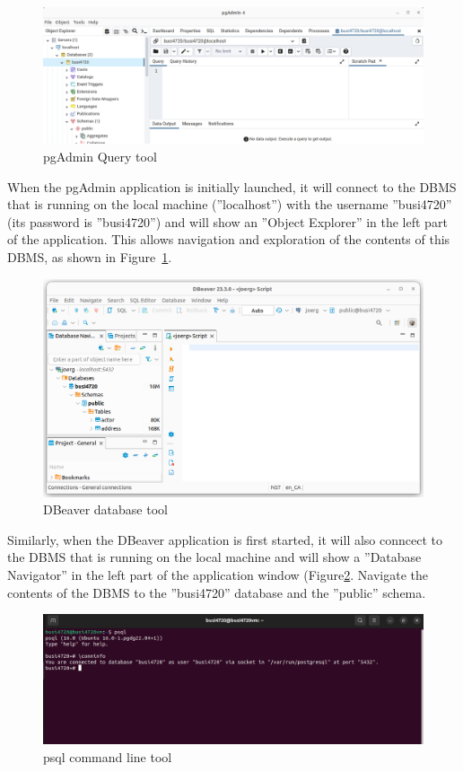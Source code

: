 \begin{figure}
\centering
\includegraphics[width=.9\textwidth]{screen2.png}
\caption{pgAdmin Query tool}
\label{fig:querytool}
\end{figure}

When the pgAdmin application is initially launched, it will connect to the DBMS that is running on the local machine (''localhost'') with the username ''busi4720'' (its password is ''busi4720'') and will show an ''Object Explorer'' in the left part of the application. This allows navigation and exploration of the contents of this DBMS, as shown in Figure~\ref{fig:querytool}.

\begin{figure}
\centering
\includegraphics[width=.9\textwidth]{screen4.png}
\caption{DBeaver database tool}
\label{fig:dbeaver}
\end{figure}

Similarly, when the DBeaver application is first started, it will also conncect to the DBMS that is running on the local machine and will show a ''Database Navigator'' in the left part of the application window (Figure\ref{fig:dbeaver}. Navigate the contents of the DBMS to the ''busi4720'' database and the ''public'' schema.

\begin{figure}
\centering
\includegraphics[width=.9\textwidth]{screen3.png}
\caption{psql command line tool}
\label{fig:psql}
\end{figure}

